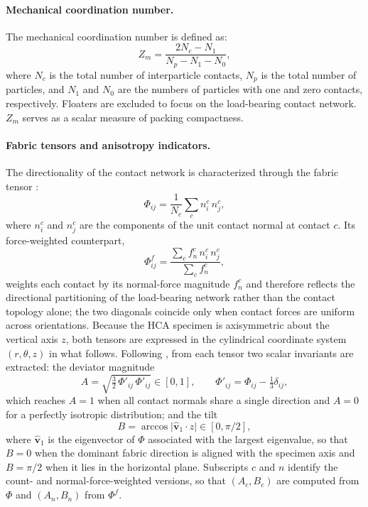 \documentclass[../main]{subfiles}
\begin{document}
\paragraph{Mechanical coordination number.}
The mechanical coordination number \citep{Thornton2000,Oda1977} is defined as:
\begin{equation}
Z_m = \frac{2N_c - N_1}{N_p - N_1 - N_0},
\label{eq:ch4_zm}
\end{equation}
where $N_c$ is the total number of interparticle contacts, $N_p$ is the total number of particles, and $N_1$ and $N_0$ are the numbers of particles with one and zero contacts, respectively. Floaters are excluded to focus on the load-bearing contact network. $Z_m$ serves as a scalar measure of packing compactness.

\paragraph{Fabric tensors and anisotropy indicators.}
The directionality of the contact network is characterized through the fabric tensor \citep{Oda1982fabric,Oda1982stat}:
\begin{equation}
\Phi_{ij} = \frac{1}{N_c}\sum_c n_i^c\,n_j^c,
\label{eq:ch4_fabric_tensor}
\end{equation}
where $n_i^c$ and $n_j^c$ are the components of the unit contact normal at contact $c$. Its force-weighted counterpart,
\begin{equation}
\Phi^f_{ij} = \frac{\sum_c f_n^c\, n_i^c\, n_j^c}{\sum_c f_n^c},
\label{eq:ch4_fabric_tensor_force}
\end{equation}
weights each contact by its normal-force magnitude $f_n^c$ and therefore reflects the directional partitioning of the load-bearing network rather than the contact topology alone; the two diagonals coincide only when contact forces are uniform across orientations. Because the HCA specimen is axisymmetric about the vertical axis $z$, both tensors are expressed in the cylindrical coordinate system $(r,\theta,z)$ in what follows. Following \citet{Zhou2022,Song2024}, from each tensor two scalar invariants are extracted: the deviator magnitude
\begin{equation}
A = \sqrt{\tfrac{3}{2}\,\Phi'_{ij}\,\Phi'_{ij}} \in [0,1],
\qquad
\Phi'_{ij} = \Phi_{ij} - \tfrac{1}{3}\delta_{ij},
\label{eq:ch4_fabric_invariants}
\end{equation}
which reaches $A = 1$ when all contact normals share a single direction and $A = 0$ for a perfectly isotropic distribution; and the tilt
\begin{equation}
B = \arccos\bigl|\hat{\bm v}_1 \cdot \hat{z}\bigr| \in [0, \pi/2],
\label{eq:ch4_fabric_tilt}
\end{equation}
where $\hat{\bm v}_1$ is the eigenvector of $\Phi$ associated with the largest eigenvalue, so that $B = 0$ when the dominant fabric direction is aligned with the specimen axis and $B = \pi/2$ when it lies in the horizontal plane. Subscripts $c$ and $n$ identify the count- and normal-force-weighted versions, so that $(A_c, B_c)$ are computed from $\Phi$ and $(A_n, B_n)$ from $\Phi^f$.
\end{document}
